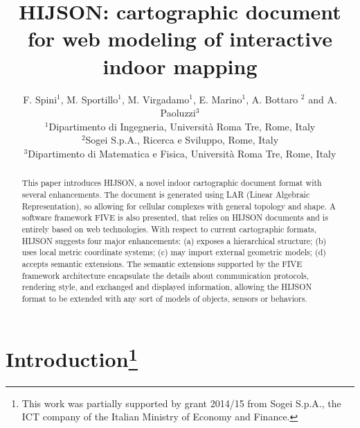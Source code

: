 \documentclass[]{egpubl}
\title[HIJSON: interactive indoor mapping]{HIJSON: cartographic document for web modeling 
of interactive indoor mapping}
\author[F. Spini, M. Sportillo, M. Virgadamo, E. Marino, A. Bottaro, \& A. Paoluzzi]
       {F. Spini$^{1}$, M. Sportillo$^{1}$, M. Virgadamo$^{1}$, E. Marino$^{1}$, A. Bottaro $^{2}$ and A. Paoluzzi$^{3}$
        \\
         $^1$Dipartimento di Ingegneria, Universit\`a Roma Tre, Rome, Italy \\
         $^2$Sogei S.p.A., Ricerca e Sviluppo, Rome, Italy \\
         $^3$Dipartimento di Matematica e Fisica, Universit\`a Roma Tre, Rome, Italy 
       }
\begin{document}

\maketitle

\begin{abstract} This paper introduces HIJSON, a novel indoor cartographic document
format with several enhancements. The document is generated using LAR (Linear Algebraic Representation), so allowing for cellular complexes with general topology and shape. 
A software framework FIVE is also presented, that relies on HIJSON
documents and is entirely based on web technologies. With respect to current
cartographic formats, HIJSON suggests four major enhancements: (a) exposes a
hierarchical structure; (b) uses local metric coordinate systems; (c) may
import external geometric models; (d) accepts semantic extensions. The
semantic extensions supported by the FIVE framework architecture encapsulate
the details about communication protocols, rendering style, and exchanged and
displayed information, allowing the HIJSON format to be extended with any sort
of models of objects, sensors or behaviors. 
\end{abstract}


\section{Introduction\footnote{This work was partially
supported by grant 2014/15 from Sogei S.p.A., the ICT company of the Italian
Ministry of Economy and Finance.}}
\end{document}
